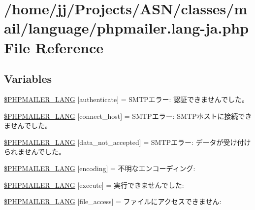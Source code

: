 \hypertarget{phpmailer_8lang-ja_8php}{}\section{/home/jj/\+Projects/\+A\+S\+N/classes/mail/language/phpmailer.lang-\/ja.php File Reference}
\label{phpmailer_8lang-ja_8php}
\subsection*{Variables}
\begin{DoxyCompactItemize}
\item 
\hyperlink{phpmailer_8lang-ja_8php_a2cb33073c989b85580748e331ed8b4aa}{\$\+P\+H\+P\+M\+A\+I\+L\+E\+R\+\_\+\+L\+A\+NG} \mbox{[}\textquotesingle{}authenticate\textquotesingle{}\mbox{]} = \textquotesingle{}S\+M\+T\+Pエラー\+: 認証できませんでした。\textquotesingle{}
\item 
\hyperlink{phpmailer_8lang-ja_8php_a2ee0cc637a06b96e45600db31c6799ee}{\$\+P\+H\+P\+M\+A\+I\+L\+E\+R\+\_\+\+L\+A\+NG} \mbox{[}\textquotesingle{}connect\+\_\+host\textquotesingle{}\mbox{]} = \textquotesingle{}S\+M\+T\+Pエラー\+: S\+M\+T\+Pホストに接続できませんでした。\textquotesingle{}
\item 
\hyperlink{phpmailer_8lang-ja_8php_a814c6b191205d2361b3233e9c9d6fda5}{\$\+P\+H\+P\+M\+A\+I\+L\+E\+R\+\_\+\+L\+A\+NG} \mbox{[}\textquotesingle{}data\+\_\+not\+\_\+accepted\textquotesingle{}\mbox{]} = \textquotesingle{}S\+M\+T\+Pエラー\+: データが受け付けられませんでした。\textquotesingle{}
\item 
\hyperlink{phpmailer_8lang-ja_8php_a817f7283f3d54c970a0c10305cc668cc}{\$\+P\+H\+P\+M\+A\+I\+L\+E\+R\+\_\+\+L\+A\+NG} \mbox{[}\textquotesingle{}encoding\textquotesingle{}\mbox{]} = \textquotesingle{}不明なエンコーディング\+: \textquotesingle{}
\item 
\hyperlink{phpmailer_8lang-ja_8php_a668217a9563a168f30f2a8548b6ed5a9}{\$\+P\+H\+P\+M\+A\+I\+L\+E\+R\+\_\+\+L\+A\+NG} \mbox{[}\textquotesingle{}execute\textquotesingle{}\mbox{]} = \textquotesingle{}実行できませんでした\+: \textquotesingle{}
\item 
\hyperlink{phpmailer_8lang-ja_8php_a7e83349023b856ef9e5c46e30ae6d51e}{\$\+P\+H\+P\+M\+A\+I\+L\+E\+R\+\_\+\+L\+A\+NG} \mbox{[}\textquotesingle{}file\+\_\+access\textquotesingle{}\mbox{]} = \textquotesingle{}ファイルにアクセスできません\+: \textquotesingle{}

\end{DoxyCompactItemize}
